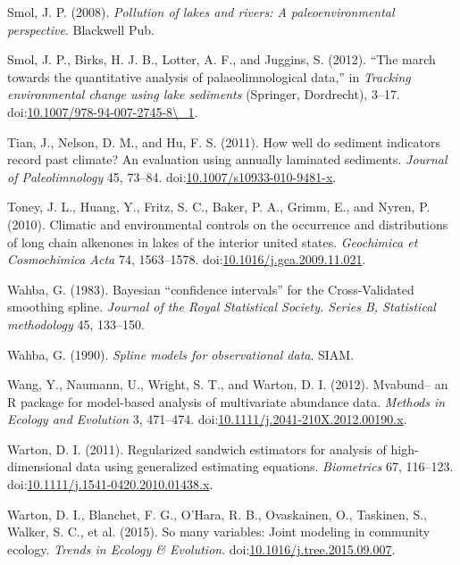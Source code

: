 \documentclass[12pt,]{article}
\begin{document}
\hypertarget{ref-Smol2008-ld}{}
Smol, J. P. (2008). \emph{Pollution of lakes and rivers: A
paleoenvironmental perspective}. Blackwell Pub.

\hypertarget{ref-Smol2012-xt}{}
Smol, J. P., Birks, H. J. B., Lotter, A. F., and Juggins, S. (2012).
``The march towards the quantitative analysis of palaeolimnological
data,'' in \emph{Tracking environmental change using lake sediments}
(Springer, Dordrecht), 3--17.
doi:\href{https://doi.org/10.1007/978-94-007-2745-8/_1}{10.1007/978-94-007-2745-8\textbackslash{}\_1}.

\hypertarget{ref-Tian2011-ip}{}
Tian, J., Nelson, D. M., and Hu, F. S. (2011). How well do sediment
indicators record past climate? An evaluation using annually laminated
sediments. \emph{Journal of Paleolimnology} 45, 73--84.
doi:\href{https://doi.org/10.1007/s10933-010-9481-x}{10.1007/s10933-010-9481-x}.

\hypertarget{ref-Toney2010-ba}{}
Toney, J. L., Huang, Y., Fritz, S. C., Baker, P. A., Grimm, E., and
Nyren, P. (2010). Climatic and environmental controls on the occurrence
and distributions of long chain alkenones in lakes of the interior
united states. \emph{Geochimica et Cosmochimica Acta} 74, 1563--1578.
doi:\href{https://doi.org/10.1016/j.gca.2009.11.021}{10.1016/j.gca.2009.11.021}.

\hypertarget{ref-Wahba1983-eh}{}
Wahba, G. (1983). Bayesian ``confidence intervals'' for the
Cross-Validated smoothing spline. \emph{Journal of the Royal Statistical
Society. Series B, Statistical methodology} 45, 133--150.

\hypertarget{ref-Wahba1990-ag}{}
Wahba, G. (1990). \emph{Spline models for observational data}. SIAM.

\hypertarget{ref-Wang2012-uu}{}
Wang, Y., Naumann, U., Wright, S. T., and Warton, D. I. (2012).
Mvabund-- an R package for model-based analysis of multivariate
abundance data. \emph{Methods in Ecology and Evolution} 3, 471--474.
doi:\href{https://doi.org/10.1111/j.2041-210X.2012.00190.x}{10.1111/j.2041-210X.2012.00190.x}.

\hypertarget{ref-Warton2011-vp}{}
Warton, D. I. (2011). Regularized sandwich estimators for analysis of
high-dimensional data using generalized estimating equations.
\emph{Biometrics} 67, 116--123.
doi:\href{https://doi.org/10.1111/j.1541-0420.2010.01438.x}{10.1111/j.1541-0420.2010.01438.x}.

\hypertarget{ref-Warton2015-ge}{}
Warton, D. I., Blanchet, F. G., O'Hara, R. B., Ovaskainen, O., Taskinen,
S., Walker, S. C., et al. (2015). So many variables: Joint modeling in
community ecology. \emph{Trends in Ecology \& Evolution}.
doi:\href{https://doi.org/10.1016/j.tree.2015.09.007}{10.1016/j.tree.2015.09.007}.
\end{document}
